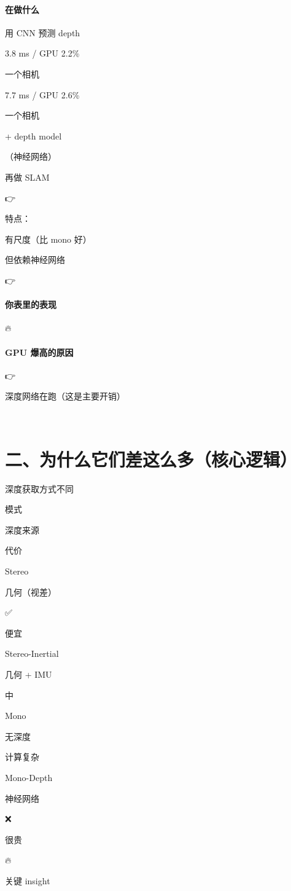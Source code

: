 \documentclass[12pt]{article}
\begin{document}
\paragraph{在做什么}
用 CNN 预测 depth

3.8 ms / GPU 2.2\%

⼀个相机

7.7 ms / GPU 2.6\%

⼀个相机

+ depth model

（神经⽹络）

再做 SLAM

👉

特点：

有尺度（比 mono 好）

但依赖神经网络

👉

\paragraph{你表里的表现}
🔥

\paragraph{GPU 爆高的原因}
👉

深度网络在跑（这是主要开销）

🧠

\section{二、为什么它们差这么多（核心逻辑）}
深度获取方式不同

模式

深度来源

代价

Stereo

几何（视差）

✅

便宜

Stereo-Inertial

几何 + IMU

中

Mono

无深度

计算复杂

Mono-Depth

神经网络

❌

很贵

🔥

关键 insight
\end{document}
